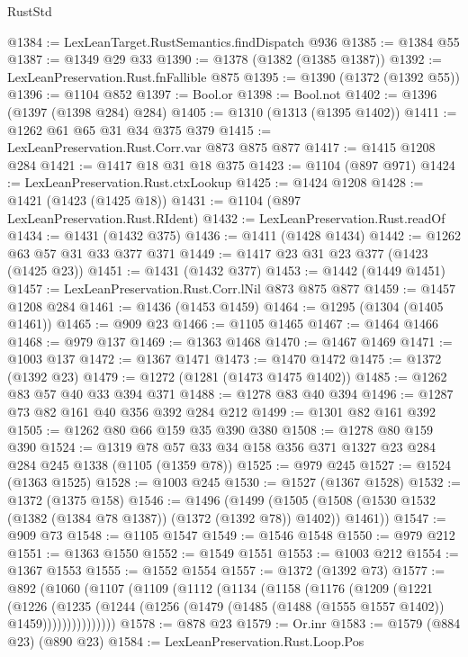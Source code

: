 \begin{lexlean}{RustStd}
\begin{coremodule}
@1384 := LexLeanTarget.RustSemantics.findDispatch @936
@1385 := @1384 @55
@1387 := @1349 @29 @33
@1390 := @1378 (@1382 (@1385 @1387))
@1392 := LexLeanPreservation.Rust.fnFallible @875
@1395 := @1390 (@1372 (@1392 @55))
@1396 := @1104 @852
@1397 := Bool.or
@1398 := Bool.not
@1402 := @1396 (@1397 (@1398 @284) @284)
@1405 := @1310 (@1313 (@1395 @1402))
@1411 := @1262 @61 @65 @31 @34 @375 @379
@1415 := LexLeanPreservation.Rust.Corr.var @873 @875 @877
@1417 := @1415 @1208 @284
@1421 := @1417 @18 @31 @18 @375
@1423 := @1104 (@897 @971)
@1424 := LexLeanPreservation.Rust.ctxLookup
@1425 := @1424 @1208
@1428 := @1421 (@1423 (@1425 @18))
@1431 := @1104 (@897 LexLeanPreservation.Rust.RIdent)
@1432 := LexLeanPreservation.Rust.readOf
@1434 := @1431 (@1432 @375)
@1436 := @1411 (@1428 @1434)
@1442 := @1262 @63 @57 @31 @33 @377 @371
@1449 := @1417 @23 @31 @23 @377 (@1423 (@1425 @23))
@1451 := @1431 (@1432 @377)
@1453 := @1442 (@1449 @1451)
@1457 := LexLeanPreservation.Rust.Corr.lNil @873 @875 @877
@1459 := @1457 @1208 @284
@1461 := @1436 (@1453 @1459)
@1464 := @1295 (@1304 (@1405 @1461))
@1465 := @909 @23
@1466 := @1105 @1465
@1467 := @1464 @1466
@1468 := @979 @137
@1469 := @1363 @1468
@1470 := @1467 @1469
@1471 := @1003 @137
@1472 := @1367 @1471
@1473 := @1470 @1472
@1475 := @1372 (@1392 @23)
@1479 := @1272 (@1281 (@1473 @1475 @1402))
@1485 := @1262 @83 @57 @40 @33 @394 @371
@1488 := @1278 @83 @40 @394
@1496 := @1287 @73 @82 @161 @40 @356 @392 @284 @212
@1499 := @1301 @82 @161 @392
@1505 := @1262 @80 @66 @159 @35 @390 @380
@1508 := @1278 @80 @159 @390
@1524 := @1319 @78 @57 @33 @34 @158 @356 @371 @1327 @23 @284 @284 @245 @1338 (@1105 (@1359 @78))
@1525 := @979 @245
@1527 := @1524 (@1363 @1525)
@1528 := @1003 @245
@1530 := @1527 (@1367 @1528)
@1532 := @1372 (@1375 @158)
@1546 := @1496
    (@1499 (@1505 (@1508 (@1530 @1532 (@1382 (@1384 @78 @1387)) (@1372 (@1392 @78)) @1402)) @1461))
@1547 := @909 @73
@1548 := @1105 @1547
@1549 := @1546 @1548
@1550 := @979 @212
@1551 := @1363 @1550
@1552 := @1549 @1551
@1553 := @1003 @212
@1554 := @1367 @1553
@1555 := @1552 @1554
@1557 := @1372 (@1392 @73)
@1577 := @892
    (@1060
      (@1107
        (@1109
          (@1112
            (@1134
              (@1158
                (@1176
                  (@1209
                    (@1221
                      (@1226
                        (@1235
                          (@1244
                            (@1256 (@1479 (@1485 (@1488 (@1555 @1557 @1402)) @1459)))))))))))))))
@1578 := @878 @23
@1579 := Or.inr
@1583 := @1579 (@884 @23) (@890 @23)
@1584 := LexLeanPreservation.Rust.Loop.Pos

\end{coremodule}
\end{lexlean}
